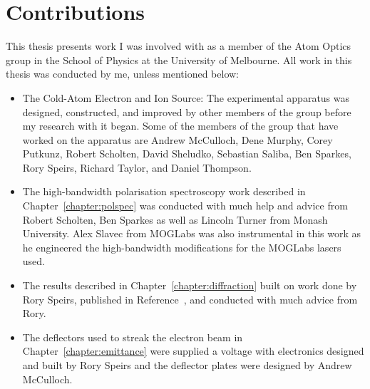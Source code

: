 \chapter*{Contributions}

This thesis presents work I was involved with as a member of the Atom Optics group in the School of Physics at the University of Melbourne.
All work in this thesis was conducted by me, unless mentioned below:
\begin{itemize}
\item The Cold-Atom Electron and Ion Source: The experimental apparatus was designed, constructed, and improved by other members of the group before my research with it began.
Some of the members of the group that have worked on the apparatus are
Andrew McCulloch, Dene Murphy, Corey Putkunz, Robert Scholten, David Sheludko, Sebastian Saliba, Ben Sparkes, Rory Speirs, Richard Taylor, and Daniel Thompson.
\item The high-bandwidth polarisation spectroscopy work described in Chapter~\ref{chapter:polspec} was conducted with much help and advice from Robert Scholten, Ben Sparkes as well as Lincoln Turner from Monash University. Alex Slavec from MOGLabs was also instrumental in this work as he engineered the high-bandwidth modifications for the MOGLabs lasers used.
\item The results described in Chapter~\ref{chapter:diffraction} built on work done by Rory Speirs, published in Reference~\cite{speirs_single-shot_2015}, and conducted with much advice from Rory.
\item The deflectors used to streak the electron beam in Chapter~\ref{chapter:emittance} were supplied a voltage with electronics designed and built by Rory Speirs and the deflector plates were designed by Andrew McCulloch.
\end{itemize}